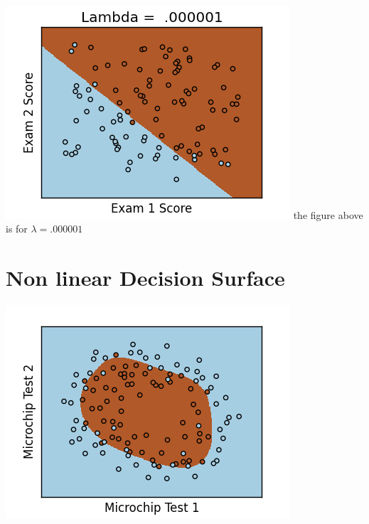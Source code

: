 \documentclass{article}
\begin{document}
\paragraph{}
\includegraphics[width = \linewidth]{Lambda_000001.png}
the figure above is for $ \lambda = .000001$ 
\paragraph{}
\section{Non linear Decision Surface}
\includegraphics[width = \linewidth]{NLDS.png}
\end{document}
